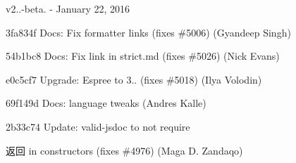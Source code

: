 v2..-\/beta. -\/ January 22, 2016


\begin{DoxyItemize}
\item 3fa834f Docs\+: Fix formatter links (fixes \#5006) (Gyandeep Singh)
\item 54b1bc8 Docs\+: Fix link in strict.\+md (fixes \#5026) (Nick Evans)
\item e0c5cf7 Upgrade\+: Espree to 3.. (fixes \#5018) (Ilya Volodin)
\item 69f149d Docs\+: language tweaks (Andres Kalle)
\item 2b33c74 Update\+: valid-\/jsdoc to not require \begin{DoxyReturn}{返回}
in constructors (fixes \#4976) (Maga D. Zandaqo)
\end{DoxyReturn}


\end{DoxyItemize}
